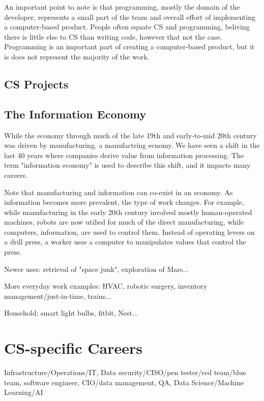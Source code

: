 An important point to note is that programming, mostly the domain of the developer, represents a small part of the team and overall effort of implementing a computer-based product. People often equate CS and programming, beliving there is little else to CS than writing code, however that not the case. Programming is an important part of creating a computer-based product, but it is does not represent the majority of the work.


\subsection{CS Projects}



\subsection{The Information Economy}


While the economy through much of the late 19th and early-to-mid 20th century was driven by manufacturing, a manufactring ecnomy. We have seen a shift in the last 40 years where companies derive value from information processing. The term "information economy" is used to describe this shift, and it impacts many careers. 

Note that manufacturing and information can co-exist in an economy. As information becomes more prevalent, the type of work changes. For example, while manufacturing in the early 20th century involved mostly human-operated machines, robots are now utilied for much of the direct manufacturing, while computers, information, are used to control them. Instead of operating levers on a drill press, a worker uses a computer to manipulates values that control the press.

Newer uses: retrieval of "space junk", exploration of Mars...

More everyday work examples: HVAC, robotic surgery, inventory management/just-in-time, trains...

Household: smart light bulbs, fitbit, Nest...

	
\section{CS-specific Careers}

Infrastructure/Operations/IT, Data security/CISO/pen tester/red team/blue team, software engineer, CIO/data management, QA, Data Science/Machine Learning/AI

